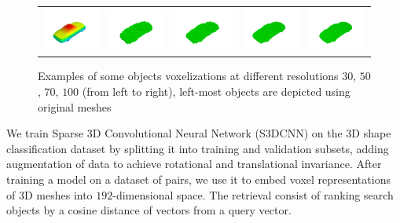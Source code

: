 \begin{figure}
\begin{tabular}{ccccc}
 \includegraphics[width=0.19\columnwidth]{Figures/shape_retrieval/pic_car_solid.png} &
 \includegraphics[width=0.19\columnwidth]{Figures/shape_retrieval/pic_car_30_solid.png} &
 \includegraphics[width=0.19\columnwidth]{Figures/shape_retrieval/pic_car_50_solid.png} &
 \includegraphics[width=0.19\columnwidth]{Figures/shape_retrieval/pic_car_70_solid.png} &
 \includegraphics[width=0.19\columnwidth]{Figures/shape_retrieval/pic_car_100_solid.png} \\
\end{tabular}
\caption{Examples of some objects voxelizations at different resolutions $30$, $50$, $70$, $100$ (from left to right), left-most objects are depicted using original meshes}
\label{fig:voxels-examples}
\end{figure}


We train Sparse 3D Convolutional Neural Network (S3DCNN) on the 3D shape classification dataset by splitting it into  training and validation subsets, adding augmentation of data to achieve rotational and translational invariance. After training a model on a dataset of pairs, we use it to embed voxel representations of 3D meshes into $192$-dimensional space. The retrieval consist of ranking search objects by a cosine distance of vectors from a query vector.

